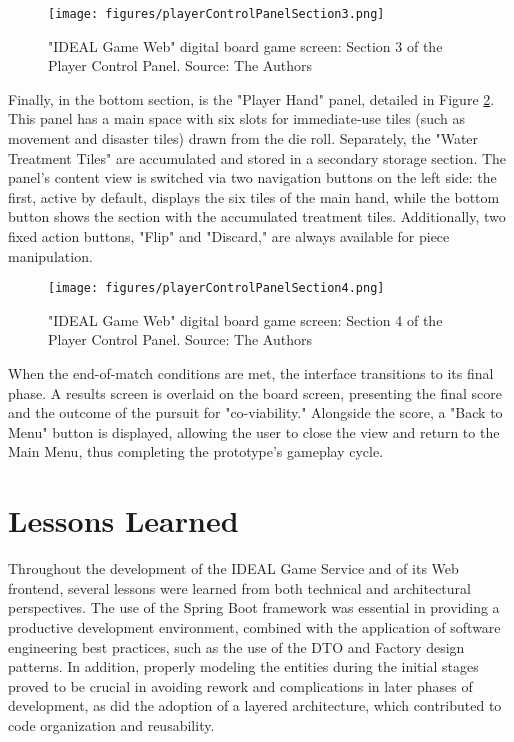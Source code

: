 \documentclass[english]{sbc2025}
\begin{document}
\begin{figure}[h]
  \centering
  \texttt{[image: figures/playerControlPanelSection3.png]}
  \caption{   "IDEAL Game Web" digital board game screen: Section 3 of the Player Control Panel. Source: The Authors}
  \label{fig_playerControlPanelSection3}
\end{figure}

Finally, in the bottom section, is the "Player Hand" panel, detailed in Figure \ref{fig_playerControlPanelSection4}. This panel has a main space with six slots for immediate-use tiles (such as movement and disaster tiles) drawn from the die roll. Separately, the "Water Treatment Tiles" are accumulated and stored in a secondary storage section. The panel's content view is switched via two navigation buttons on the left side: the first, active by default, displays the six tiles of the main hand, while the bottom button shows the section with the accumulated treatment tiles. Additionally, two fixed action buttons, "Flip" and "Discard," are always available for piece manipulation.


\begin{figure}[h]
  \centering
  \texttt{[image: figures/playerControlPanelSection4.png]}
  \caption{  "IDEAL Game Web" digital board game screen: Section 4 of the Player Control Panel. Source: The Authors}
  \label{fig_playerControlPanelSection4}
\end{figure}

When the end-of-match conditions are met, the interface transitions to its final phase. A results screen is overlaid on the board screen, presenting the final score and the outcome of the pursuit for "co-viability." Alongside the score, a "Back to Menu" button is displayed, allowing the user to close the view and return to the Main Menu, thus completing the prototype's gameplay cycle.


\section{Lessons Learned}

Throughout the development of the IDEAL Game Service and of its Web frontend, several lessons were learned from both technical and architectural perspectives. The use of the Spring Boot framework was essential in providing a productive development environment, combined with the application of software engineering best practices, such as the use of the DTO and Factory design patterns. In addition, properly modeling the entities during the initial stages proved to be crucial in avoiding rework and complications in later phases of development, as did the adoption of a layered architecture, which contributed to code organization and reusability.
\end{document}
